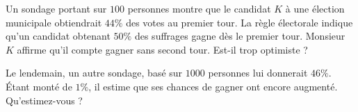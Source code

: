 
\begin{exercice}\label{exosmath-0702}

    Un sondage portant sur \( 100\) personnes montre que le candidat \( K\) à une élection municipale obtiendrait \( 44\%\) des votes au premier tour. La règle électorale indique qu'un candidat obtenant \( 50\%\) des suffrages gagne dès le premier tour. Monsieur \( K\) affirme qu'il compte gagner sans second tour. Est-il trop optimiste ?

    Le lendemain, un autre sondage, basé sur \( 1000\) personnes lui donnerait \( 46\% \). Étant monté de \( 1\%\), il estime que ses chances de gagner ont encore augmenté. Qu'estimez-vous ?

\end{exercice}
